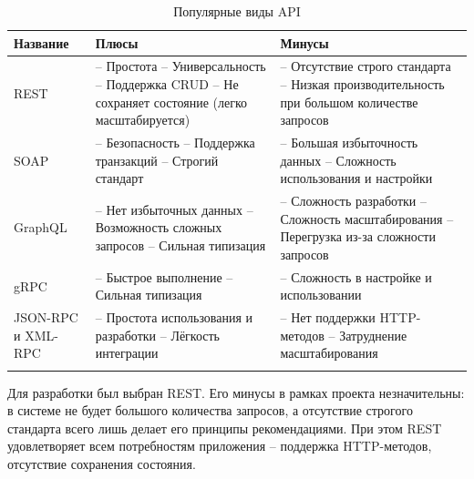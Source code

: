 \documentclass[a4paper,article]{article}
\begin{document}
\begin{sloppypar}
    \begin{xltabular}{\textwidth} { |
            >{\hsize} X |
            >{\hsize} X |
            >{\hsize} X | }
        \hline
        Название
        & Плюсы
        & Минусы \\
        \hline
        REST
        & -- Простота \newline -- Универсальность \newline -- Поддержка CRUD \newline -- Не сохраняет состояние (легко масштабируется)
        & -- Отсутствие строго стандарта \newline -- Низкая производительность при большом количестве запросов \\
        \hline
        SOAP
        & -- Безопасность \newline -- Поддержка транзакций \newline -- Строгий стандарт
        & -- Большая избыточность данных \newline -- Сложность использования и настройки \\
        \hline
        GraphQL
        & -- Нет избыточных данных \newline -- Возможность сложных запросов \newline -- Сильная типизация
        & -- Сложность разработки \newline -- Сложность масштабирования \newline -- Перегрузка из-за сложности запросов \\
        \hline
        gRPC
        & -- Быстрое выполнение \newline -- Сильная типизация
        & -- Сложность в настройке и использовании \\
        \hline
        JSON-RPC и XML-RPC
        & -- Простота использования и разработки \newline -- Лёгкость интеграции
        & -- Нет поддержки HTTP-методов \newline -- Затруднение масштабирования \\
        \hline

        \caption{\centering Популярные виды API}

        \label{tab:Популярные виды API}
    \end{xltabular}

    Для разработки был выбран REST. Его минусы в рамках проекта незначительны: в системе не будет большого количества запросов, а отсутствие строгого стандарта всего лишь делает его принципы рекомендациями. При этом REST удовлетворяет всем потребностям приложения -- поддержка HTTP-методов, отсутствие сохранения состояния.


\end{sloppypar}
\end{document}
